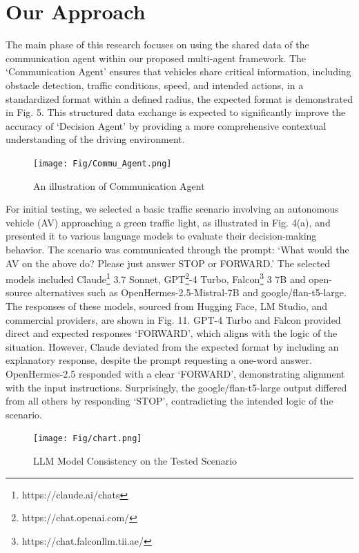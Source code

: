 \documentclass[conference]{IEEEtran}
\begin{document}
 


\section{Our Approach}
The main phase of this research focuses on using the shared data of the communication agent within our proposed multi-agent framework. The `Communication Agent' ensures that vehicles share critical information, including obstacle detection, traffic conditions, speed, and intended actions, in a standardized format within a defined radius, the expected format is demonstrated in Fig. 5. This structured data exchange is expected to significantly improve the accuracy of `Decision Agent' by providing a more comprehensive contextual understanding of the driving environment.
 \begin{figure}[!ht]
     \centering
     \texttt{[image: Fig/Commu\_Agent.png]}
     \caption{An illustration of Communication Agent}
     \label{fig:enter-label}
 \end{figure} 
For initial testing, we selected a basic traffic scenario involving an autonomous vehicle (AV) approaching a green traffic light, as illustrated in Fig. 4(a), and presented it to various language models to evaluate their decision-making behavior. The scenario was communicated through the prompt: `What would the AV on the above do? Please just answer STOP or FORWARD.' The selected models included Claude\footnote{https://claude.ai/chats} 3.7 Sonnet, GPT\footnote{https://chat.openai.com/}-4 Turbo, Falcon\footnote{https://chat.falconllm.tii.ae/} 3 7B and open-source alternatives such as OpenHermes-2.5-Mistral-7B and google/flan-t5-large. The responses of these models, sourced from Hugging Face, LM Studio, and commercial providers, are shown in Fig. 11. GPT-4 Turbo and Falcon provided direct and expected responses `FORWARD', which aligns with the logic of the situation. However, Claude deviated from the expected format by including an explanatory response, despite the prompt requesting a one-word answer. OpenHermes-2.5 responded with a clear `FORWARD', demonstrating alignment with the input instructions. Surprisingly, the google/flan-t5-large output differed from all others by responding `STOP', contradicting the intended logic of the scenario.

 \begin{figure}[b]
     \centering
     \texttt{[image: Fig/chart.png]}
     \caption{LLM Model Consistency on the Tested Scenario}
     \label{fig:enter-label}
 \end{figure}
 
\end{document}
